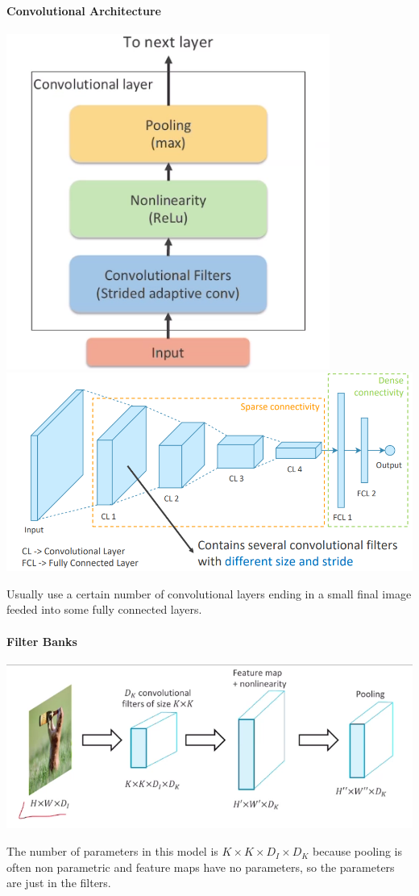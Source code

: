 \documentclass[10pt]{report}
\begin{document}
\paragraph{Convolutional Architecture}
\begin{center}
	\includegraphics[scale=0.5]{55.png}
	\includegraphics[scale=0.5]{212.png}
\end{center}
Usually use a certain number of convolutional layers ending in a small final image feeded into some fully connected layers.
\pagebreak
\paragraph{Filter Banks}
\begin{center}
	\includegraphics[scale=0.5]{56.png}
\end{center}
The number of parameters in this model is $K\times K\times D_I\times D_K$ because pooling is often non parametric and feature maps have no parameters, so the parameters are just in the filters.
\end{document}
